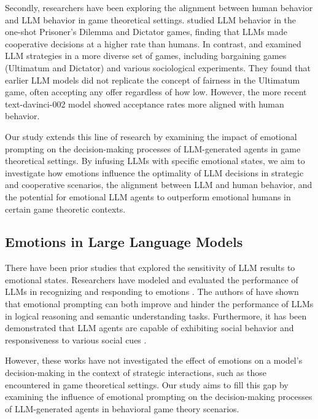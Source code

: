 \documentclass{article}
\begin{document}
Secondly, researchers have been exploring the alignment between human behavior and LLM behavior in game theoretical settings. \cite{brookins} studied LLM behavior in the one-shot Prisoner's Dilemma and Dictator games, finding that LLMs made cooperative decisions at a higher rate than humans. In contrast, \cite{horton2023large} and \cite{aher2023using} examined LLM strategies in a more diverse set of games, including bargaining games (Ultimatum and Dictator) and various sociological experiments. They found that earlier LLM models did not replicate the concept of fairness in the Ultimatum game, often accepting any offer regardless of how low. However, the more recent text-davinci-002 model showed acceptance rates more aligned with human behavior.

Our study extends this line of research by examining the impact of emotional prompting on the decision-making processes of LLM-generated agents in game theoretical settings. By infusing LLMs with specific emotional states, we aim to investigate how emotions influence the optimality of LLM decisions in strategic and cooperative scenarios, the alignment between LLM and human behavior, and the potential for emotional LLM agents to outperform emotional humans in certain game theoretic contexts.

\subsection{Emotions in Large Language Models}
There have been prior studies that explored the sensitivity of LLM results to emotional states. Researchers have modeled and evaluated the performance of LLMs in recognizing and responding to emotions \cite{huang2024emotionally, li2023languagespecific, lei2023instructerc, croissant2023appraisalbased, vzorin2023emotional}. The authors of \cite{li2023large,li2023good} have shown that emotional prompting can both improve and hinder the performance of LLMs in logical reasoning and semantic understanding tasks. Furthermore, it has been demonstrated that LLM agents are capable of exhibiting social behavior and responsiveness to various social cues \cite{leng2023llm}.

However, these works have not investigated the effect of emotions on a model's decision-making in the context of strategic interactions, such as those encountered in game theoretical settings. Our study aims to fill this gap by examining the influence of emotional prompting on the decision-making processes of LLM-generated agents in behavioral game theory scenarios.
\end{document}
